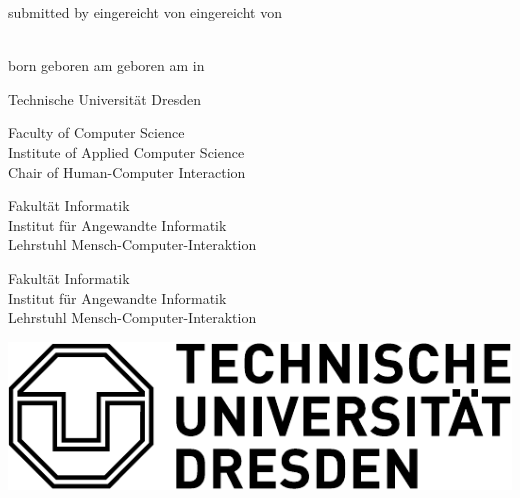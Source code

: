 
\begin{titlepage}

\begin{center}

	{\large
		\doctype\relax
	}
	
	\vspace{.5cm}
	
	{\huge \bfseries \sffamily
		\doctitle\relax
		\par
	}
	
	\vspace{1.5cm}
	
	\ifx\doclanguage\english
		submitted by
	\fi
	\ifx\doclanguage\german
		eingereicht von
	\fi
	\ifx\doclanguage\ngerman
		eingereicht von
	\fi
	
	\vspace{.5cm}
	
	\textbf{\authorname} \\
	\ifx\doclanguage\english
		born
	\fi
	\ifx\doclanguage\german
		geboren am
	\fi
	\ifx\doclanguage\ngerman
		geboren am
	\fi
	\authorbirthday{} in \authorbirthplace

	
	\vspace{1.5cm}
	
	{\Large Technische Universität Dresden}
	
	\vspace{.5cm}
	
	\ifx\doclanguage\english
		Faculty of Computer Science \\
		Institute of Applied Computer Science \\
		Chair of Human-Computer Interaction

	\fi
	\ifx\doclanguage\german
		Fakultät Informatik \\
		Institut für Angewandte Informatik \\
		Lehrstuhl Mensch-Computer-Interaktion

	\fi
	\ifx\doclanguage\ngerman
		Fakultät Informatik \\
		Institut für Angewandte Informatik \\
		Lehrstuhl Mensch-Computer-Interaktion

	\fi
	
	\vspace{1.0cm}
	
	\includegraphics[scale=.75]{includes/figures/tu_logo}
	

\end{center}
\end{titlepage}
